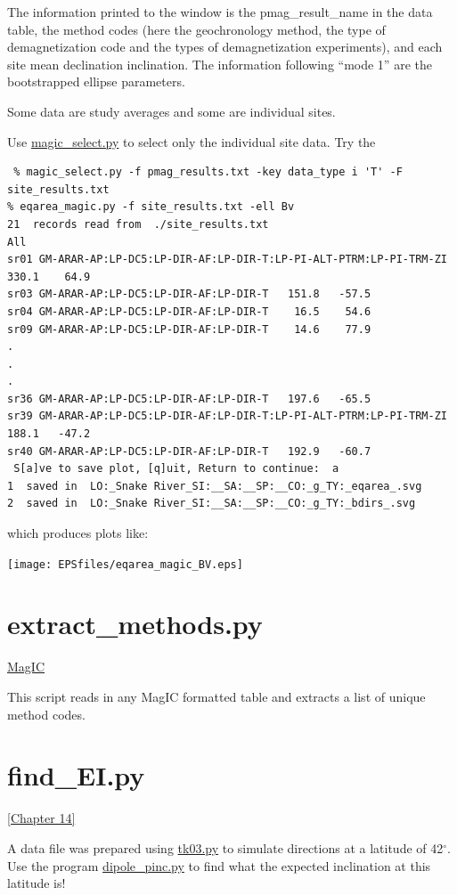 \documentclass[11pt]{book}
\begin{document}
{{{{The information printed to the window is the pmag\_result\_name in the data table, the method codes (here the geochronology method, the type of demagnetization code and the types of demagnetization experiments), and each site mean declination  inclination.    The information following ``mode 1'' are the bootstrapped ellipse parameters.

Some data are study averages and some are individual sites.
 
 Use \href{#magic_select.py}{magic\_select.py} to select only the individual site data.  Try the 
 
 \begin{verbatim}
 % magic_select.py -f pmag_results.txt -key data_type i 'T' -F site_results.txt
% eqarea_magic.py -f site_results.txt -ell Bv
21  records read from  ./site_results.txt
All
sr01 GM-ARAR-AP:LP-DC5:LP-DIR-AF:LP-DIR-T:LP-PI-ALT-PTRM:LP-PI-TRM-ZI   330.1    64.9
sr03 GM-ARAR-AP:LP-DC5:LP-DIR-AF:LP-DIR-T   151.8   -57.5
sr04 GM-ARAR-AP:LP-DC5:LP-DIR-AF:LP-DIR-T    16.5    54.6
sr09 GM-ARAR-AP:LP-DC5:LP-DIR-AF:LP-DIR-T    14.6    77.9
.
.
.
sr36 GM-ARAR-AP:LP-DC5:LP-DIR-AF:LP-DIR-T   197.6   -65.5
sr39 GM-ARAR-AP:LP-DC5:LP-DIR-AF:LP-DIR-T:LP-PI-ALT-PTRM:LP-PI-TRM-ZI   188.1   -47.2
sr40 GM-ARAR-AP:LP-DC5:LP-DIR-AF:LP-DIR-T   192.9   -60.7
 S[a]ve to save plot, [q]uit, Return to continue:  a
1  saved in  LO:_Snake River_SI:__SA:__SP:__CO:_g_TY:_eqarea_.svg
2  saved in  LO:_Snake River_SI:__SA:__SP:__CO:_g_TY:_bdirs_.svg
\end{verbatim}

which produces plots like:

 \texttt{[image: EPSfiles/eqarea\_magic\_BV.eps]}}

\section{extract\_methods.py}
\href{#MagIC}{MagIC}

This script reads in any MagIC formatted table and extracts a list of unique method codes.




\section {\bf find\_EI.py}
 \href{http://Webbook2.html#The_ancient_geomagnetic_field}{ [Chapter 14]}%

A data file was prepared using \href{#tk03}{tk03.py} to simulate directions at a latitude of 42$^{\circ}$.   Use the program \href{#dipole_pinc.py}{dipole\_pinc.py} to find what the expected inclination at this latitude is!    

}}}
\end{document}
